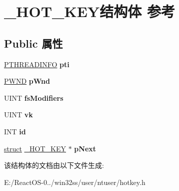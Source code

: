 \hypertarget{struct___h_o_t___k_e_y}{}\section{\+\_\+\+H\+O\+T\+\_\+\+K\+E\+Y结构体 参考}
\label{struct___h_o_t___k_e_y}
\subsection*{Public 属性}
\begin{DoxyCompactItemize}
\item 
\mbox{\label{struct___h_o_t___k_e_y_a1c645d6839ef84334b24d789299ffea4}} 
\hyperlink{struct___t_h_r_e_a_d_i_n_f_o}{P\+T\+H\+R\+E\+A\+D\+I\+N\+FO} {\bfseries pti}
\item 
\mbox{\label{struct___h_o_t___k_e_y_ae9d85ea3c7d8d42587429c3b8b723c24}} 
\hyperlink{struct___w_n_d}{P\+W\+ND} {\bfseries p\+Wnd}
\item 
\mbox{\label{struct___h_o_t___k_e_y_a0eaceb0a04d2927e15bc62c792e9faf0}} 
U\+I\+NT {\bfseries fs\+Modifiers}
\item 
\mbox{\label{struct___h_o_t___k_e_y_ace7a115771006088615227f94a10efa5}} 
U\+I\+NT {\bfseries vk}
\item 
\mbox{\label{struct___h_o_t___k_e_y_a997c9844ef4921f6ab1199a96ba8e0e3}} 
I\+NT {\bfseries id}
\item 
\mbox{\label{struct___h_o_t___k_e_y_a4bf43f2bb128c978fa989d57465e17ff}} 
\hyperlink{interfacestruct}{struct} \hyperlink{struct___h_o_t___k_e_y}{\+\_\+\+H\+O\+T\+\_\+\+K\+EY} $\ast$ {\bfseries p\+Next}
\end{DoxyCompactItemize}


该结构体的文档由以下文件生成\+:\begin{DoxyCompactItemize}
\item 
E\+:/\+React\+O\+S-\/0../win32ss/user/ntuser/hotkey.\+h\end{DoxyCompactItemize}
